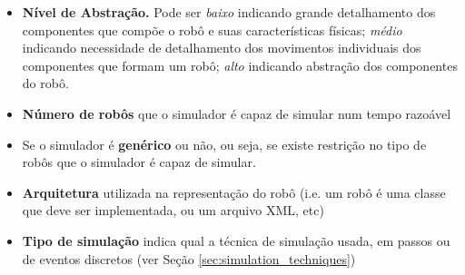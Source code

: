 \begin{itemize}
    \item \textbf{Nível de Abstração.} Pode ser \emph{baixo} indicando grande detalhamento dos componentes que compõe o robô e suas características físicas; \emph{médio} indicando necessidade de detalhamento dos movimentos individuais dos componentes que formam um robô; \emph{alto} indicando abstração dos componentes do robô.
    \item \textbf{Número de robôs} que o simulador é capaz de simular num tempo razoável
    \item Se o simulador é \textbf{genérico} ou não, ou seja, se existe restrição no tipo de robôs que o simulador é capaz de simular.
    \item \textbf{Arquitetura} utilizada na representação do robô (i.e. um robô é uma classe que deve ser implementada, ou um arquivo XML, etc)
    \item \textbf{Tipo de simulação} indica qual a técnica de simulação usada, em passos ou de eventos discretos (ver Seção \ref{sec:simulation_techniques})
\end{itemize}

